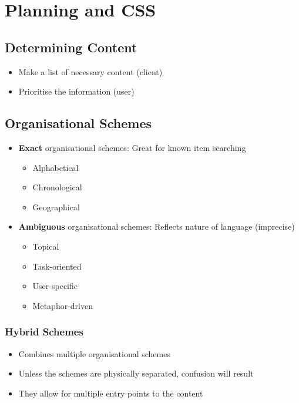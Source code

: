 \section{Planning and CSS}
\subsection{Determining Content}
\begin{itemize}
	\item Make a list of necessary content (client)
	\item Prioritise the information (user)
\end{itemize}

\subsection{Organisational Schemes}
\begin{itemize}
	\item \textbf{Exact} organisational schemes: Great for known item searching
	\begin{itemize}
		\item Alphabetical
		\item Chronological
		\item Geographical
	\end{itemize}
	\item \textbf{Ambiguous} organisational schemes: Reflects nature of language (imprecise)
	\begin{itemize}
		\item Topical
		\item Task-oriented
		\item User-specific
		\item Metaphor-driven
	\end{itemize}
\end{itemize}

\subsubsection{Hybrid Schemes}
\begin{itemize}
	\item Combines multiple organisational schemes
	\item Unless the schemes are physically separated, confusion will result
	\item They allow for multiple entry points to the content	
\end{itemize}


